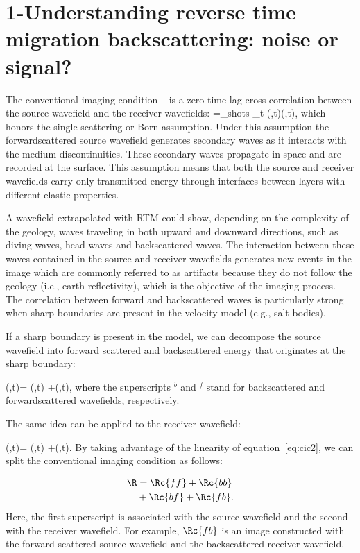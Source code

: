 

\section{1-Understanding reverse time migration backscattering: noise or signal?}

The conventional imaging condition ~\citep{Claerbout:1985:IEI:3887}
is a zero time lag cross-correlation between the source wavefield and the 
receiver wavefields:
%
\beq
\R=\sum_{shots} \sum_{t} \US(\xx,t)\UR(\xx,t),
\label{eq:cic2}
\eeq
%
which honors the single scattering or Born assumption. Under this assumption the forwardscattered 
source wavefield generates secondary waves as it interacts with the medium discontinuities. These secondary waves propagate in 
space and are recorded at the surface. This assumption means that both the source and receiver
wavefields carry only transmitted energy through interfaces between layers with different elastic properties.

A wavefield extrapolated with RTM could show, depending on the complexity of the geology, waves traveling in both
upward and downward directions, such as diving waves, head waves and backscattered waves. The interaction between
 these waves contained in the source and receiver wavefields generates new events in the image which are 
commonly referred to as artifacts because they do not follow the geology (i.e., earth reflectivity), which is the objective 
of the imaging process. The correlation between forward and backscattered waves is particularly strong when
sharp boundaries are present in the velocity model (e.g., salt bodies).

If a sharp boundary is present in the model, we can decompose the source wavefield into forward scattered 
 and backscattered energy that originates at the sharp boundary:

\beq
\US(\xx,t)= \USr(\xx,t) +\USt(\xx,t),
\label{eq:ssplit}
\eeq
%
where the superscripts $^b$ and $^f$ stand for backscattered and forwardscattered wavefields, respectively. 

The same idea can be applied to the receiver wavefield:

\beq
\UR(\xx,t)= \URr(\xx,t) +\URt(\xx,t).
\label{eq:rsplit}
\eeq
%
By taking advantage of the linearity of equation~\ref{eq:cic2},  we
can split the conventional imaging condition as follows:

\begin{align}
\nonumber \R &= \Rc{ff} +\Rc{bb}\\
             &+ \Rc{bf}+ \Rc{fb}.
\label{eq:cicsplit}
\end{align}
%
Here, the first superscript is associated with the source wavefield and the second with the
receiver wavefield. For example, $\Rc{fb}$ is an image constructed with the forward scattered source wavefield
and the backscattered receiver wavefield.

